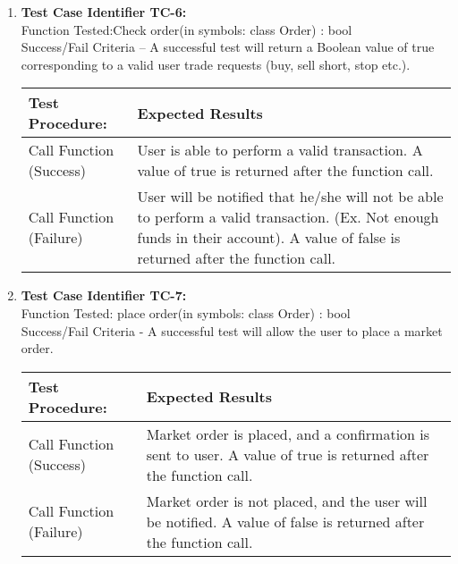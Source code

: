   \begin{enumerate}
  \item
    \textbf{Test Case Identifier TC-6:}\\

    Function Tested:Check order(in symbols: class Order) : bool\\

    Success/Fail Criteria – A successful test will return a Boolean value of
    true corresponding to a valid user trade requests (buy, sell short, stop
    etc.).\\

    \begin{longtable}{|p{2in}|p{4.5in}|}
    \hline
    {\large \color{color1}Test Procedure:}&{\large \color{color1}Expected Results}\\ \hline
    Call Function (Success) & User is able to perform a valid transaction.
    A value of true is returned after the function call. \\ \hline
    Call Function (Failure) & User will be notified that he/she will not be
    able to perform a valid transaction. (Ex. Not enough funds in their account).
    A value of false is returned after the function call. \\ \hline
    \end{longtable}
    \vspace{5mm}


  \item
    \textbf{Test Case Identifier TC-7:}\\

    Function Tested: place order(in symbols: class Order) : bool\\

    Success/Fail Criteria - A successful test will allow the user to place a
    market order.\\

    \begin{longtable}{|p{2in}|p{4.5in}|}
    \hline
    {\large \color{color1}Test Procedure:}&{\large \color{color1}Expected Results}\\ \hline
    Call Function (Success) & Market order is placed, and a confirmation is sent
    to user. A value of true is returned after the function call. \\ \hline
    Call Function (Failure) & Market order is not placed, and the user will be
    notified. A value of false is returned after the function call.\\ \hline
    \end{longtable}
    \vspace{5mm}



\end{enumerate}
